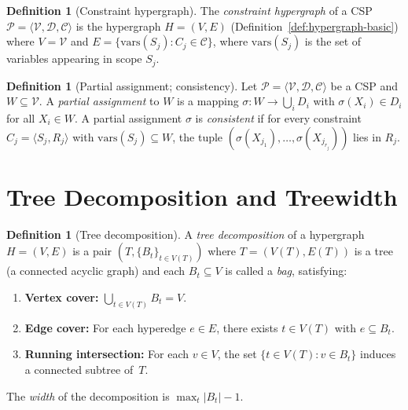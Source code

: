 \documentclass[11pt,a4paper]{article}
\theoremstyle{plain}
\theoremstyle{definition}
\newtheorem{definition}[theorem]{Definition}
\theoremstyle{remark}
\begin{document}
\begin{definition}[Constraint hypergraph]\label{def:constraint-hypergraph}
The \emph{constraint hypergraph} of a CSP $\mathcal{P} = \langle \mathcal{V}, \mathcal{D}, \mathcal{C} \rangle$ is the hypergraph $H = (V, E)$ (Definition~\ref{def:hypergraph-basic}) where $V = \mathcal{V}$ and $E = \{\mathrm{vars}(S_j) : C_j \in \mathcal{C}\}$, where $\mathrm{vars}(S_j)$ is the set of variables appearing in scope $S_j$.
\end{definition}

\begin{definition}[Partial assignment; consistency]\label{def:partial-assignment}
Let $\mathcal{P} = \langle \mathcal{V}, \mathcal{D}, \mathcal{C} \rangle$ be a CSP and $W \subseteq \mathcal{V}$.
A \emph{partial assignment} to $W$ is a mapping $\sigma\colon W \to \bigcup_i D_i$ with $\sigma(X_i) \in D_i$ for all $X_i \in W$.
A partial assignment $\sigma$ is \emph{consistent} if for every constraint $C_j = \langle S_j, R_j \rangle$ with $\mathrm{vars}(S_j) \subseteq W$, the tuple $(\sigma(X_{j_1}), \ldots, \sigma(X_{j_{r_j}}))$ lies in $R_j$.
\end{definition}

\section{Tree Decomposition and Treewidth}\label{sec:treewidth}

\begin{definition}[Tree decomposition]\label{def:treedecomp}
A \emph{tree decomposition} of a hypergraph $H = (V, E)$ is a pair $(T, \{B_t\}_{t \in V(T)})$ where $T = (V(T), E(T))$ is a tree (a connected acyclic graph) and each $B_t \subseteq V$ is called a \emph{bag}, satisfying:
\begin{enumerate}[nosep,label=(T\arabic*)]
  \item\label{td:cover} \textbf{Vertex cover:} $\bigcup_{t \in V(T)} B_t = V$.
  \item\label{td:edge} \textbf{Edge cover:} For each hyperedge $e \in E$, there exists $t \in V(T)$ with $e \subseteq B_t$.
  \item\label{td:subtree} \textbf{Running intersection:} For each $v \in V$, the set $\{t \in V(T) : v \in B_t\}$ induces a connected subtree of~$T$.
\end{enumerate}
The \emph{width} of the decomposition is $\max_{t} |B_t| - 1$.
\end{definition}
\end{document}
